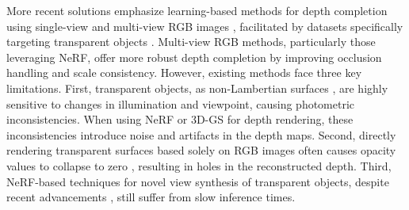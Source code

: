 More recent solutions emphasize learning-based methods for depth completion using single-view \cite{zhu-2021-cvpr, fang-2022-ral} and multi-view RGB images \cite{kerr-2022-corl, ichnowski-2022-corl, duisterhof2024residualnerf}, facilitated by datasets specifically targeting transparent objects \cite{wang-2022-cvpr, bashkirova-2022-cvpr, chen-2022-eccv}. Multi-view RGB methods, particularly those leveraging \ac{NeRF}, offer more robust depth completion by improving occlusion handling and scale consistency. However, existing methods face three key limitations. First, transparent objects, as non-Lambertian surfaces \cite{sajjan2020clear}, are highly sensitive to changes in illumination and viewpoint, causing photometric inconsistencies. When using NeRF or \ac{3D-GS} for depth rendering, these inconsistencies introduce noise and artifacts in the depth maps. Second, directly rendering transparent surfaces based solely on RGB images often causes opacity values to collapse to zero \cite{lee2023nfl}, resulting in holes in the reconstructed depth. Third, NeRF-based techniques for novel view synthesis of transparent objects, despite recent advancements \cite{ichnowski-2022-corl,duisterhof2024residualnerf}, still suffer from slow inference times.





